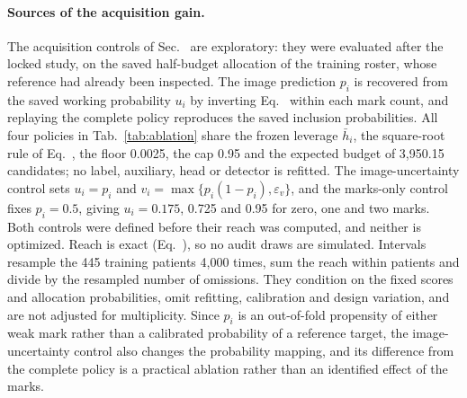 \paragraph{Sources of the acquisition gain.}
The acquisition controls of Sec.~ are exploratory: they were evaluated after the locked study, on the saved half-budget allocation of the training roster, whose reference had already been inspected. The image prediction $p_i$ is recovered from the saved working probability $u_i$ by inverting Eq.~ within each mark count, and replaying the complete policy reproduces the saved inclusion probabilities. All four policies in Tab.~\ref{tab:ablation} share the frozen leverage $\bar h_i$, the square-root rule of Eq.~, the floor 0.0025, the cap 0.95 and the expected budget of 3,950.15 candidates; no label, auxiliary, head or detector is refitted. The image-uncertainty control sets $u_i=p_i$ and $v_i=\max\{p_i(1-p_i),\varepsilon_v\}$, and the marks-only control fixes $p_i=0.5$, giving $u_i=0.175$, 0.725 and 0.95 for zero, one and two marks. Both controls were defined before their reach was computed, and neither is optimized. Reach is exact (Eq.~), so no audit draws are simulated. Intervals resample the 445 training patients 4,000 times, sum the reach within patients and divide by the resampled number of omissions. They condition on the fixed scores and allocation probabilities, omit refitting, calibration and design variation, and are not adjusted for multiplicity. Since $p_i$ is an out-of-fold propensity of either weak mark rather than a calibrated probability of a reference target, the image-uncertainty control also changes the probability mapping, and its difference from the complete policy is a practical ablation rather than an identified effect of the marks.

\begin{table}[t]
\centering\small
\begin{minipage}[t]{\columnwidth}
\centering
\caption{Sources of the acquisition gain at half budget (post hoc replay, no retraining). Top: expected training targets reached among the 92 omissions, the 35 omissions without any weak mark and all 541 targets. Bottom: complete policy minus each control, in expected omissions and in percentage points of omission reach, with conditional patient-bootstrap 95\% intervals.}
\label{tab:ablation}
\setlength{\tabcolsep}{2.2pt}

\end{minipage}\hfill
\begin{minipage}[t]{\columnwidth}
\centering
\caption{Leverage factorial at half budget: expected training targets reached among the 92 omissions, the 35 omissions without any weak mark and all 541 targets, and the expected number of patients with at least one audit.}
\label{tab:leverage}
\setlength{\tabcolsep}{2.6pt}

\end{minipage}
\end{table}

